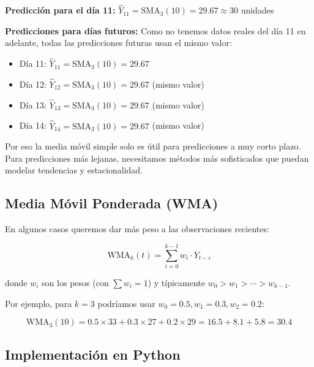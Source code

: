 \documentclass[12pt]{article}
\begin{document}
\vspace{0.5em}

\textbf{Predicción para el día 11:} $\hat{Y}_{11} = \text{SMA}_3(10) = 29.67 \approx 30$ unidades

\vspace{0.5em}

\textbf{Predicciones para días futuros:} Como no tenemos datos reales del día 11 en adelante, todas las predicciones futuras usan el mismo valor:
\begin{itemize}
    \item Día 11: $\hat{Y}_{11} = \text{SMA}_3(10) = 29.67$
    \item Día 12: $\hat{Y}_{12} = \text{SMA}_3(10) = 29.67$ (mismo valor)
    \item Día 13: $\hat{Y}_{13} = \text{SMA}_3(10) = 29.67$ (mismo valor)
    \item Día 14: $\hat{Y}_{14} = \text{SMA}_3(10) = 29.67$ (mismo valor)
\end{itemize}

Por eso la media móvil simple solo es útil para predicciones a muy corto plazo. Para predicciones más lejanas, necesitamos métodos más sofisticados que puedan modelar tendencias y estacionalidad.

\subsection{Media Móvil Ponderada (WMA)}

En algunos casos queremos dar más peso a las observaciones recientes:

\[
\text{WMA}_k(t) = \sum_{i=0}^{k-1} w_i \cdot Y_{t-i}
\]

donde $w_i$ son los pesos (con $\sum w_i = 1$) y típicamente $w_0 > w_1 > \cdots > w_{k-1}$.

Por ejemplo, para $k=3$ podríamos usar $w_0 = 0.5, w_1 = 0.3, w_2 = 0.2$:

\[
\text{WMA}_3(10) = 0.5 \times 33 + 0.3 \times 27 + 0.2 \times 29 = 16.5 + 8.1 + 5.8 = 30.4
\]

\subsection{Implementación en Python}
\end{document}
